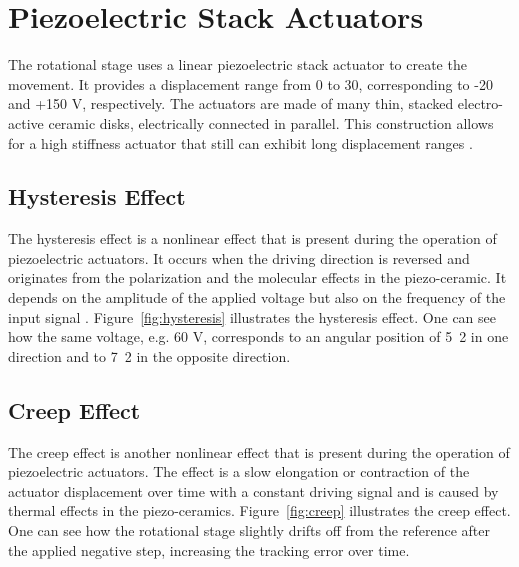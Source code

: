 \section{Piezoelectric Stack Actuators}
The rotational stage uses a linear piezoelectric stack actuator to create the movement. It provides a displacement range from 0 to \unit{30}{\micro\meter}, corresponding to -20 and +150 V, respectively. The actuators are made of many thin, stacked electro-active ceramic disks, electrically connected in parallel. This construction allows for a high stiffness actuator that still can exhibit long displacement ranges \citep{Piezo:2008}.

\subsection{Hysteresis Effect}
The hysteresis effect is a nonlinear effect that is present during the operation of piezoelectric actuators. It occurs when the driving direction is reversed and originates from the polarization and the molecular effects in the piezo-ceramic. It depends on the amplitude of the applied voltage but also on the frequency of the input signal \citep{Qingson:2016}. Figure~\ref{fig:hysteresis} illustrates the hysteresis effect. One can see how the same voltage, e.g. 60 V, corresponds to an angular position of \unit{5.2}{\micro\rad} in one direction and to \unit{7.2}{\micro\rad} in the opposite direction.

\subsection{Creep Effect}
The creep effect is another nonlinear effect that is present during the operation of piezoelectric actuators. The effect is a slow elongation or contraction of the actuator displacement over time with a constant driving signal and is caused by thermal effects in the piezo-ceramics. Figure~\ref{fig:creep} illustrates the creep effect. One can see how the rotational stage slightly drifts off from the reference after the applied negative step, increasing the tracking error over time.

